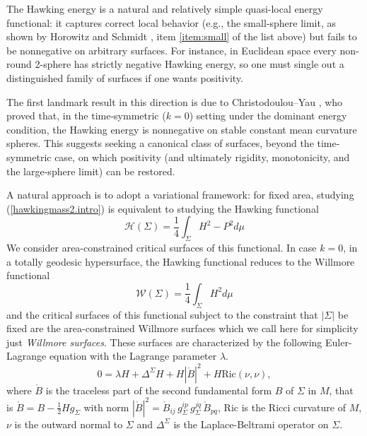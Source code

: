 \documentclass[12pt,a4paper]{amsart}
\theoremstyle{plain}
\theoremstyle{definition}
\begin{document}
The Hawking energy is a natural and relatively simple quasi-local energy functional: it captures correct local behavior (e.g., the small‐sphere limit, as shown by Horowitz and Schmidt \cite{Haw},  item  \ref{item:small}   of the list above) but fails to be nonnegative on arbitrary surfaces. For instance, in Euclidean space  every non-round 2-sphere has strictly negative Hawking energy, so one must single out a distinguished family of surfaces if one wants positivity.


The first landmark result in this direction is due to Christodoulou–Yau \cite{Chriyau}, who proved that, in the time‐symmetric ($k=0$) setting under the dominant energy condition, the Hawking energy is nonnegative on stable constant mean curvature spheres. This suggests seeking a canonical class of surfaces, beyond the time-symmetric case, on which positivity (and ultimately rigidity, monotonicity, and the large-sphere limit) can be restored.

A natural approach is to adopt a variational framework: for fixed area,  studying (\ref{hawkingmass2.intro}) is equivalent to studying the Hawking functional 
\begin{equation}\label{hawfun}
    \mathcal{H}(\Sigma)= \frac{1}{4} \int_\Sigma H^2 - P^2 d\mu
\end{equation}
We consider area-constrained critical surfaces of this functional. In case $k=0$, in a totally geodesic hypersurface, the Hawking functional reduces to the Willmore functional 
\begin{equation*}
    \mathcal{W}(\Sigma)= \frac{1}{4} \int_\Sigma H^2  d\mu 
\end{equation*}
and the critical surfaces of this functional subject to the constraint that $|\Sigma| $ be fixed are the area-constrained Willmore surfaces which we call here for simplicity just \emph{Willmore surfaces}. These surfaces are characterized by the following Euler-Lagrange equation with the Lagrange parameter $\lambda$.
\begin{equation}\label{Willeq}
    0= \lambda H  +\Delta^\Sigma H + H|\mathring{B}|^2+ H \mathrm{Ric}(\nu, \nu), 
\end{equation}
where $\mathring{B}$   is the traceless part of the second
fundamental form $B$ of $\Sigma$ in $M$, that is $ \mathring{B} = B- \frac{1}{2} H g_\Sigma$ with norm  $|\mathring{B}|^2 = \mathring{B}_{ij}\, g_\Sigma^{ip}\, g_\Sigma^{jq}\, \mathring{B}_{pq}$,  $\mathrm{Ric}$ is the Ricci curvature of $M$, $\nu$ is the outward normal to $\Sigma$  and $\Delta^\Sigma $ is the Laplace-Beltrami operator on $\Sigma$.
\end{document}
